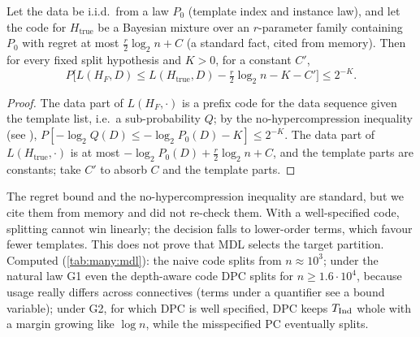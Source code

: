 \begin{proposition}\label{prop:many:mdlwell}
Let the data be i.i.d.\ from a law $P_0$ (template index and instance law), and let the code for $H_{\mathrm{true}}$ be a
Bayesian mixture over an $r$-parameter family containing $P_0$ with regret at most $\frac r2\log_2n+C$
\citep{rissanen1986stochastic,clarke1990information} (a standard fact, cited from memory). Then for every fixed split hypothesis and $K>0$, for a constant
$C'$,
\[P\bigl[L(H_F,D)\le L(H_{\mathrm{true}},D)-\tfrac r2\log_2n-K-C'\bigr]\le2^{-K}.\]
\end{proposition}
\begin{proof}
The data part of $L(H_F,\cdot)$ is a prefix code for the data sequence given the template list, i.e.\ a sub-probability
$Q$; by the no-hypercompression inequality (see \citealp{grunwald2007minimum}), $P[-\log_2Q(D)\le-\log_2P_0(D)-K]\le2^{-K}$.
The data part of $L(H_{\mathrm{true}},\cdot)$ is at most $-\log_2P_0(D)+\frac r2\log_2n+C$, and the template parts are
constants; take $C'$ to absorb $C$ and the template parts.
\end{proof}
The regret bound and the no-hypercompression inequality are standard, but we cite them from memory and did not re-check
them. With a well-specified code, splitting cannot win linearly; the decision falls to lower-order terms, which favour
fewer templates. This does not prove that MDL selects the target partition. Computed (\cref{tab:many:mdl}): the naive code
splits from $n\approx10^3$; under the natural law G1 even the depth-aware code DPC splits for $n\ge1.6\cdot10^4$, because
usage really differs across connectives (terms under a quantifier see a bound variable); under G2, for which DPC is well
specified, DPC keeps $T_{\mathrm{Ind}}$ whole with a margin growing like $\log n$, while the misspecified PC eventually splits.

